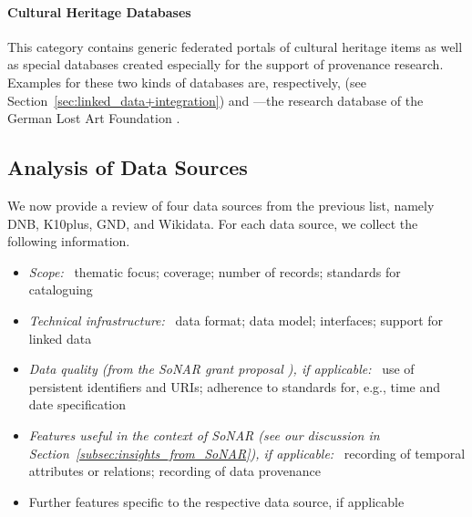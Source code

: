 \paragraph{Cultural Heritage Databases}

This category contains generic federated portals of cultural heritage items
as well as special databases created especially for the support of provenance research.
Examples for these two kinds of databases are, respectively,  \autocite{Europeana} (see Section~\ref{sec:linked_data+integration})
and ---the research database of the German Lost Art Foundation \autocite{Proveana}.

\subsection{Analysis of Data Sources}
\label{subsec:analysis_data_sources}


We now provide a review of four data sources from the previous list, namely
\gls{DNB}, \gls{K10plus}, \gls{GND}, and Wikidata.
%
%
%
For each data source, we collect the following information.
%
\begin{itemize}
  \item
    \emph{Scope:}~
    thematic focus; coverage; number of records; standards for cataloguing
  \item
    \emph{Technical infrastructure:}~
    data format; data model; interfaces; support for linked data
  \item
    \emph{Data quality (from the \gls{SoNAR} grant proposal \autocite[p.\,19ff.]{SchneiderKempf2018}),
    if applicable:}~
    use of persistent identifiers and \glspl{URI}; adherence to standards for, e.g., time and date specification
  \item
    \emph{Features useful in the context of \gls{SoNAR} (see our discussion in Section~\ref{subsec:insights_from_SoNAR}), if applicable:}~
    recording of temporal attributes or relations; recording of data provenance
  \item
    Further features specific to the respective data source, if applicable
\end{itemize}

